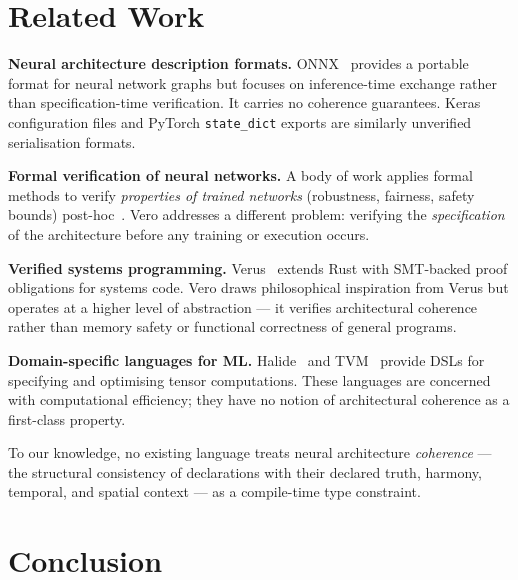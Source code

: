 \documentclass[11pt,a4paper]{article}
\begin{document}
\section{Related Work}
\label{sec:related}

\textbf{Neural architecture description formats.}
ONNX~\cite{bai2019onnx} provides a portable format for neural network graphs but
focuses on inference-time exchange rather than specification-time verification.
It carries no coherence guarantees. Keras configuration files and PyTorch
\texttt{state\_dict} exports are similarly unverified serialisation formats.

\textbf{Formal verification of neural networks.}
A body of work applies formal methods to verify \emph{properties of trained networks}
(robustness, fairness, safety bounds) post-hoc~\cite{katz2017reluplex,liu2021algorithms}.
Vero addresses a different problem: verifying the \emph{specification} of the architecture
before any training or execution occurs.

\textbf{Verified systems programming.}
Verus~\cite{lattuada2023verus} extends Rust with SMT-backed proof obligations for
systems code. Vero draws philosophical inspiration from Verus but operates at a higher
level of abstraction --- it verifies architectural coherence rather than memory safety
or functional correctness of general programs.

\textbf{Domain-specific languages for ML.}
Halide~\cite{ragan2013halide} and TVM~\cite{chen2018tvm} provide DSLs for specifying
and optimising tensor computations. These languages are concerned with computational
efficiency; they have no notion of architectural coherence as a first-class property.

To our knowledge, no existing language treats neural architecture \emph{coherence} ---
the structural consistency of declarations with their declared truth, harmony, temporal,
and spatial context --- as a compile-time type constraint.

\section{Conclusion}
\label{sec:conclusion}
\end{document}
